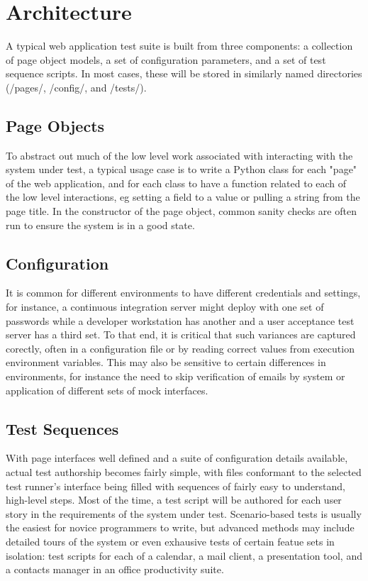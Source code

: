 \section{Architecture}
A typical web application test suite is built from three components: a collection of page object models, a set of configuration parameters, and a set of test sequence scripts. In most cases, these will be stored in similarly named directories (/pages/, /config/, and /tests/).

\subsection{Page Objects}
To abstract out much of the low level work associated with interacting with the system under test, a typical usage case is to write a Python class for each "page" of the web application, and for each class to have a function related to each of the low level interactions, eg setting a field to a value or pulling a string from the page title. In the constructor of the page object, common sanity checks are often run to ensure the system is in a good state. \citep{liu2000object, kung2000object, leotta2013improving, marchetto2008state}

\subsection{Configuration}
It is common for different environments to have different credentials and settings, for instance, a continuous integration server might deploy with one set of passwords while a developer workstation has another and a user acceptance test server has a third set. To that end, it is critical that such variances are captured corectly, often in a configuration file or by reading correct values from execution environment variables. This may also be sensitive to certain differences in environments, for instance the need to skip verification of emails by system or application of different sets of mock interfaces.

\subsection{Test Sequences}
With page interfaces well defined and a suite of configuration details available, actual test authorship becomes fairly simple, with files conformant to the selected test runner's interface being filled with sequences of fairly easy to understand, high-level steps. Most of the time, a test script will be authored for each user story in the requirements of the system under test. Scenario-based tests is usually the easiest for novice programmers to write, but advanced methods may include detailed tours of the system or even exhausive tests of certain featue sets in isolation: test scripts for each of a calendar, a mail client, a presentation tool, and a contacts manager in an office productivity suite.\citep{leotta2013capture}

